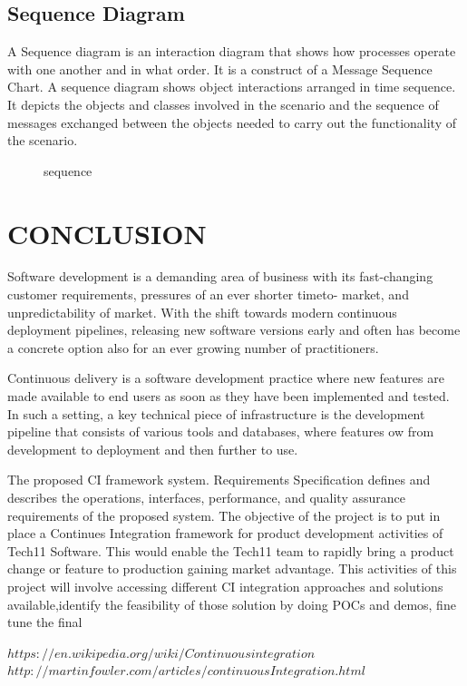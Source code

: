 \documentclass[12pt,a4paper,oneside]{report}
\begin{document}
\section{Sequence Diagram}
\par A Sequence diagram is an interaction diagram that shows how processes operate with
one another and in what order. It is a construct of a Message Sequence Chart. A sequence
diagram shows object interactions arranged in time sequence. It depicts the objects and classes
involved in the scenario and the sequence of messages exchanged between the objects needed
to carry out the functionality of the scenario.
\begin{figure}[h]
\begin{center}

\hspace{.0 in}
\caption{sequence}
\end{center}

\end{figure}


\chapter{CONCLUSION}
Software development is a demanding area of business with its
fast-changing customer requirements, pressures of an ever shorter timeto- market, and unpredictability
of market. With the shift towards modern continuous deployment pipelines, releasing
new software versions early and often has become a concrete option also for an ever
growing number of practitioners. \par Continuous delivery is a software development practice where new features are made
available to end users as soon as they have been implemented and tested. In such a setting, a
key technical piece of infrastructure is the development pipeline that consists of various tools
and databases, where features ow from development to deployment and then further to use.
\par
The proposed CI framework system. Requirements Specification defines and describes the operations, interfaces,
performance, and quality assurance requirements of the proposed system. 
The objective of the project is to put in place a Continues Integration framework for
product development activities of Tech11 Software. This would enable the Tech11 team to
rapidly bring a product change or feature to production gaining market advantage. This activities
of this project will involve accessing different CI integration approaches and solutions
available,identify the feasibility of those solution by doing POCs and demos, fine tune the final

\begin{thebibliography}{999}

$https://en.wikipedia.org/wiki/Continuous integration$
  $http://martinfowler.com/articles/continuousIntegration.html$

\end{thebibliography}
\end{document}
